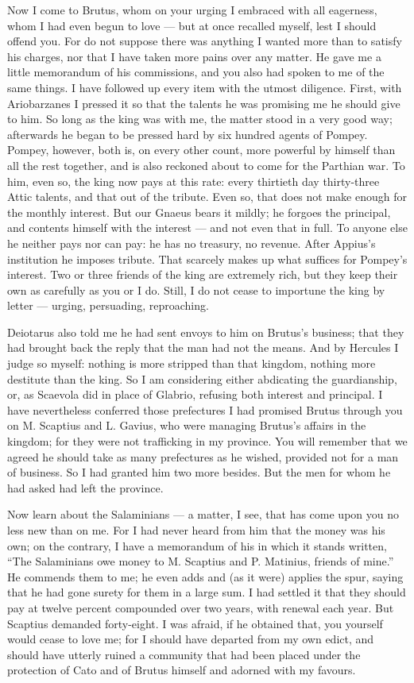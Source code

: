  Now I come to Brutus, whom on your urging I embraced with all eagerness, whom I had even begun to love --- but at once recalled myself, lest I should offend you. For do not suppose there was anything I wanted more than to satisfy his charges, nor that I have taken more pains over any matter. He gave me a little memorandum of his commissions, and you also had spoken to me of the same things. I have followed up every item with the utmost diligence. First, with Ariobarzanes I pressed it so that the talents he was promising me he should give to him. So long as the king was with me, the matter stood in a very good way; afterwards he began to be pressed hard by six hundred agents of Pompey. Pompey, however, both is, on every other count, more powerful by himself than all the rest together, and is also reckoned about to come for the Parthian war. To him, even so, the king now pays at this rate: every thirtieth day thirty-three Attic talents, and that out of the tribute. Even so, that does not make enough for the monthly interest. But our Gnaeus bears it mildly; he forgoes the principal, and contents himself with the interest --- and not even that in full. To anyone else he neither pays nor can pay: he has no treasury, no revenue. After Appius's institution he imposes tribute. That scarcely makes up what suffices for Pompey's interest. Two or three friends of the king are extremely rich, but they keep their own as carefully as you or I do. Still, I do not cease to importune the king by letter --- urging, persuading, reproaching.

 Deiotarus also told me he had sent envoys to him on Brutus's business; that they had brought back the reply that the man had not the means. And by Hercules I judge so myself: nothing is more stripped than that kingdom, nothing more destitute than the king. So I am considering either abdicating the guardianship, or, as Scaevola did in place of Glabrio, refusing both interest and principal. I have nevertheless conferred those prefectures I had promised Brutus through you on M. Scaptius and L. Gavius, who were managing Brutus's affairs in the kingdom; for they were not trafficking in my province. You will remember that we agreed he should take as many prefectures as he wished, provided not for a man of business. So I had granted him two more besides. But the men for whom he had asked had left the province.

 Now learn about the Salaminians --- a matter, I see, that has come upon you no less new than on me. For I had never heard from him that the money was his own; on the contrary, I have a memorandum of his in which it stands written, ``The Salaminians owe money to M. Scaptius and P. Matinius, friends of mine.'' He commends them to me; he even adds and (as it were) applies the spur, saying that he had gone surety for them in a large sum. I had settled it that they should pay at twelve percent compounded over two years, with renewal each year. But Scaptius demanded forty-eight. I was afraid, if he obtained that, you yourself would cease to love me; for I should have departed from my own edict, and should have utterly ruined a community that had been placed under the protection of Cato and of Brutus himself and adorned with my favours.

